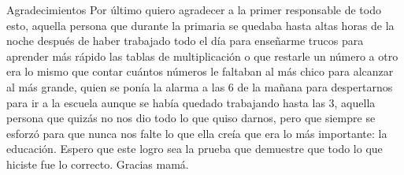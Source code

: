\documentclass[screen,pagebackref]{ibtesis}
\begin{document}
\begin{postliminary}
\begin{seccion}{Agradecimientos}
        Por último quiero agradecer a la primer responsable de todo esto, aquella persona que durante la primaria se quedaba hasta altas horas de la noche después de haber trabajado todo el día para enseñarme trucos para aprender más rápido las tablas de multiplicación o que restarle un número a otro era lo mismo que contar cuántos números le faltaban al más chico para alcanzar al más grande, quien se ponía la alarma a las 6 de la mañana para despertarnos para ir a la escuela aunque se había quedado trabajando hasta las 3, aquella persona que quizás no nos dio todo lo que quiso darnos, pero que siempre se esforzó para que nunca nos falte lo que ella creía que era lo más importante: la educación. Espero que este logro sea la prueba que demuestre que todo lo que hiciste fue lo correcto. Gracias mamá.

    \end{seccion}

\end{postliminary}
\end{document}
